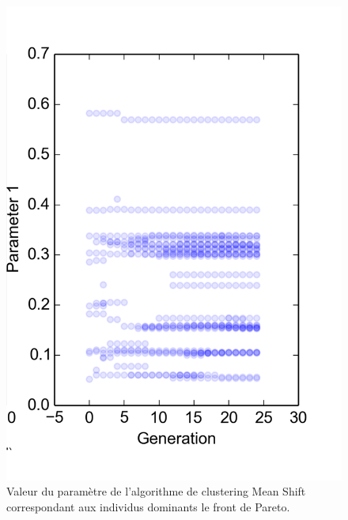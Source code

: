 \documentclass{llncs}
\begin{document}
\begin{figure}[!tbp]
  \centering
  \begin{minipage}[b]{0.4\textwidth}
    \includegraphics[width=\textwidth]{figures/Pareto_front.pdf}
    \caption{Valeur du paramètre de l'algorithme de clustering Mean Shift correspondant aux individus dominants le front de Pareto.}
    \label{fig:pareto_front}
  \end{minipage}
  \hfill
  \begin{minipage}[b]{0.5\textwidth}

\end{minipage}
\end{figure}
\end{document}
